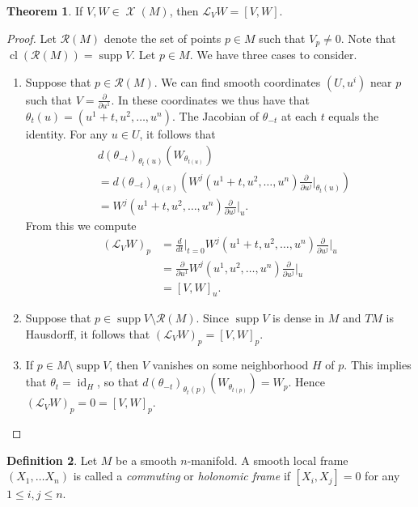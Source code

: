 \documentclass[10pt,letterpaper,cm]{nupset}
\theoremstyle{definition}
\newtheorem{definition}{Definition}[subsection]
\theoremstyle{theorem}
\newtheorem{theorem}[definition]{Theorem}
\theoremstyle{remark}
\newcommand{\1}{\mathbf{1}}
\newcommand{\0}{\vec 0}
\DeclareMathOperator{\id}{id}
\DeclareMathOperator{\supp}{supp}
\DeclareMathOperator{\cl}{cl}
\DeclareMathOperator{\vf}{\mathscr{X}}
\begin{document}
\begin{theorem}
If $V, W\in \vf(M)$, then $\mathcal{L}_VW = [V, W]$.
\end{theorem}
\begin{proof}
Let $\mathcal{R}(M)$ denote the set of points $p\in M$ such that $V_p\ne 0$. Note that $\cl\left(\mathcal{R}(M)\right) = \supp V$. Let $p\in M$. We have three cases to consider.
\begin{enumerate}
\item Suppose that $p\in \mathcal{R}(M)$. We can find smooth coordinates $\left(U, u^i\right)$ near $p$ such that $V= \frac{\partial}{\partial{u^1}}$. In these coordinates we thus have that $\theta_t(u) = (u^1 +t, u^2, \ldots, u^n)$. The Jacobian of ${\theta_{-t}}$ at each $t$ equals the identity. For any $u\in U$, it follows that
\begin{align*}
& d(\theta_{-t})_{\theta_t(u)}\left(W_{\theta_{t(u)}}\right)
\\ & = d(\theta_{-t})_{\theta_t(x)} \left(W^j(u^1 + t, u^2, \ldots, u^n)\frac{\partial}{\partial{u^j}}\bigr\rvert_{\theta_t(u)}\right)
\\ & = W^j(u^1 + t, u^2, \ldots, u^n)\frac{\partial}{\partial{u^j}}\bigr\rvert_{u}.
\end{align*}
From this we compute
\begin{align*}
 \left(\mathcal{L}_VW\right)_p &= \frac{d}{dt}\bigr\rvert_{t=0} W^j(u^1 + t, u^2, \ldots, u^n)\frac{\partial}{\partial{u^j}}\bigr\rvert_{u}
\\ & = \frac{\partial}{\partial{u^1}}W^j(u^1 , u^2, \ldots, u^n)\frac{\partial}{\partial{u^j}}\bigr\rvert_{u}
\\ & = \left[V, W\right]_u
.\end{align*}
\item Suppose that $p\in \supp V \setminus \mathcal{R}(M)$. Since $\supp V$ is dense in $M$ and $TM$ is Hausdorff, it follows that $\left(\mathcal{L}_VW\right)_p = \left[V, W\right]_p$.
\item If $p\in  M\setminus \supp V$, then $V$ vanishes on some neighborhood $H$ of $p$. This implies that $\theta_t = \id_H$, so that $d(\theta_{-t})_{\theta_t(p)}\left(W_{\theta_{t(p)}}\right) = W_p$. Hence $\left(\mathcal{L}_VW\right)_p =0 = [V, W]_p$.
\end{enumerate}
\end{proof}

\begin{definition}
Let $M$ be a smooth $n$-manifold. A smooth local frame $\left(X_1, \ldots X_n\right)$ is called a \textit{commuting} or \textit{holonomic frame} if $\left[X_i, X_j\right]=0$ for any $1\leq i,j\leq n$.
\end{definition}
\end{document}
